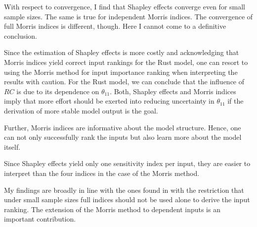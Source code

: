 With respect to convergence, I find that Shapley effects converge even for small sample sizes. The same is true for independent Morris indices. The convergence of full Morris indices is different, though. Here I cannot come to a definitive conclusion.

Since the estimation of Shapley effects is more costly and acknowledging that Morris
indices yield correct input rankings for the Rust model, one can resort to using the Morris
method for input importance ranking when interpreting the results with caution. For the Rust model, we can conclude that the influence of $RC$ is due to its dependence on $\theta_{11}$. Both, Shapley effects and Morris indices imply that more effort should be exerted into reducing uncertainty in $\theta_{11}$ if the derivation of more stable model output is the goal.

Further, Morris indices are informative about the model structure. Hence, one can not only successfully rank the inputs but also learn more about the model itself.

Since Shapley effects yield only one sensitivity index per input, they are easier to interpret than the four indices in the case of the Morris method.

My findings are broadly in line with the ones found in \citet{GM17} with the restriction that under small sample sizes full indices should not be used alone to derive the input ranking. The extension of the Morris method to dependent inputs is an important contribution.